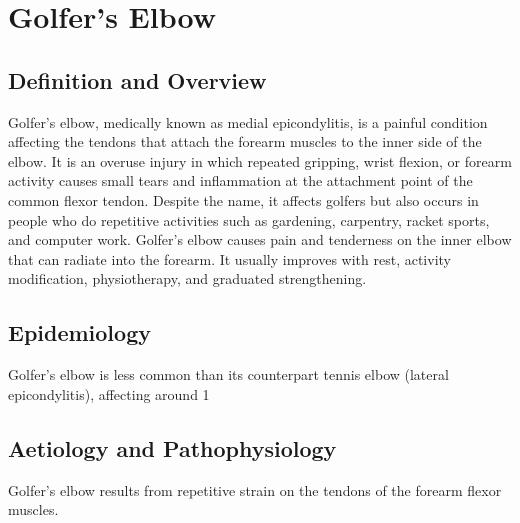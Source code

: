 \chapter{Golfer's Elbow}

\section*{Definition and Overview}
Golfer's elbow, medically known as medial epicondylitis, is a painful condition affecting the tendons that attach the forearm muscles to the inner side of the elbow. It is an overuse injury in which repeated gripping, wrist flexion, or forearm activity causes small tears and inflammation at the attachment point of the common flexor tendon. Despite the name, it affects golfers but also occurs in people who do repetitive activities such as gardening, carpentry, racket sports, and computer work. Golfer's elbow causes pain and tenderness on the inner elbow that can radiate into the forearm. It usually improves with rest, activity modification, physiotherapy, and graduated strengthening.

\section*{Epidemiology}
Golfer's elbow is less common than its counterpart tennis elbow (lateral epicondylitis), affecting around 1%

\section*{Aetiology and Pathophysiology}
Golfer's elbow results from repetitive strain on the tendons of the forearm flexor muscles.

